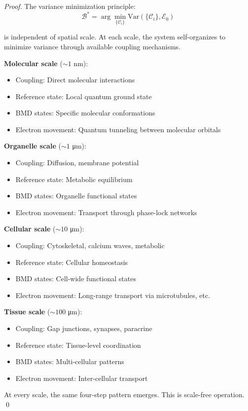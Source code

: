 \begin{proof}
The variance minimization principle:
\begin{equation}
\mathcal{B}^* = \arg\min_{\{\mathcal{C}_i\}} \text{Var}(\{\mathcal{C}_i\}, \mathcal{E}_0)
\end{equation}

is independent of spatial scale. At each scale, the system self-organizes to minimize variance through available coupling mechanisms.

\textbf{Molecular scale} ($\sim 1$ nm):
\begin{itemize}
\item Coupling: Direct molecular interactions
\item Reference state: Local quantum ground state
\item BMD states: Specific molecular conformations
\item Electron movement: Quantum tunneling between molecular orbitals
\end{itemize}

\textbf{Organelle scale} ($\sim 1$ μm):
\begin{itemize}
\item Coupling: Diffusion, membrane potential
\item Reference state: Metabolic equilibrium
\item BMD states: Organelle functional states
\item Electron movement: Transport through phase-lock networks
\end{itemize}

\textbf{Cellular scale} ($\sim 10$ μm):
\begin{itemize}
\item Coupling: Cytoskeletal, calcium waves, metabolic
\item Reference state: Cellular homeostasis
\item BMD states: Cell-wide functional states
\item Electron movement: Long-range transport via microtubules, etc.
\end{itemize}

\textbf{Tissue scale} ($\sim 100$ μm):
\begin{itemize}
\item Coupling: Gap junctions, synapses, paracrine
\item Reference state: Tissue-level coordination
\item BMD states: Multi-cellular patterns
\item Electron movement: Inter-cellular transport
\end{itemize}

At every scale, the same four-step pattern emerges. This is scale-free operation. \qed
\end{proof}
